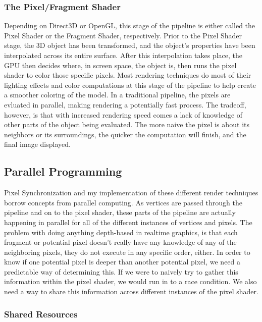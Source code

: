 \documentclass[a4paper, 12pt]{article}
\begin{document}
\subsubsection{The Pixel/Fragment Shader}

Depending on Direct3D or OpenGL, this stage of the pipeline is either called
the Pixel Shader or the Fragment Shader, respectively. Prior to the Pixel
Shader stage, the 3D object has been transformed, and the object's properties
have been interpolated across its entire surface. After this interpolation
takes place, the GPU then decides where, in screen space, the object is, then
runs the pixel shader to color those specific pixels. Most rendering
techniques do most of their lighting effects and color computations at this
stage of the pipeline to help create a smoother coloring of the model. In a
traditional pipeline, the pixels are evluated in parallel, making rendering a
potentially fast process. The tradeoff, however, is that with increased
rendering speed comes a lack of knowledge of other parts of the object being
evaluated. The more naive the pixel is about its neighbors or its
surroundings, the quicker the computation will finish, and the final image
displayed.

\subsection{Parallel Programming}

Pixel Synchronization and my implementation of these different render
techniques borrow concepts from parallel computing. As vertices are passed
through the pipeline and on to the pixel shader, these parts of the pipeline
are actually happening in parallel for all of the different instances of
vertices and pixels. The problem with doing anything depth-based in realtime
graphics, is that each fragment or potential pixel doesn't really have any
knowledge of any of the neighboring pixels, they do not execute in any
specific order, either. In order to know if one potential pixel is deeper than
another potential pixel, we need a predictable way of determining this. If we
were to naively try to gather this information within the pixel shader, we
would run in to a race condition. We also need a way to share this information
across different instances of the pixel shader.

\subsubsection{Shared Resources}
\end{document}
